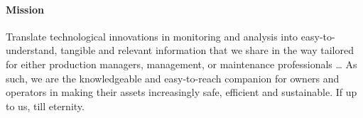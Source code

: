 \paragraph{Mission}
Translate technological innovations in monitoring and analysis into easy-to-understand, tangible and relevant information that we share in the way tailored for either production managers, management, or maintenance professionals \dots
As such, we are the knowledgeable and easy-to-reach companion for owners and operators in making their assets increasingly safe, efficient and sustainable. If up to us, till eternity.
